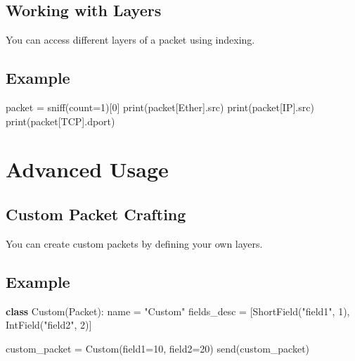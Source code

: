 \documentclass[
  letterpaper,
  DIV=11,
  numbers=noendperiod]{scrreprt}
\newenvironment{Shaded}{\begin{snugshade}}{\end{snugshade}}
\newcommand{\BuiltInTok}[1]{\textcolor[rgb]{0.00,0.23,0.31}{#1}}
\newcommand{\DecValTok}[1]{\textcolor[rgb]{0.68,0.00,0.00}{#1}}
\newcommand{\KeywordTok}[1]{\textcolor[rgb]{0.00,0.23,0.31}{\textbf{#1}}}
\newcommand{\NormalTok}[1]{\textcolor[rgb]{0.00,0.23,0.31}{#1}}
\newcommand{\OperatorTok}[1]{\textcolor[rgb]{0.37,0.37,0.37}{#1}}
\newcommand{\StringTok}[1]{\textcolor[rgb]{0.13,0.47,0.30}{#1}}
\begin{document}
\subsection{Working with Layers}\label{working-with-layers}

You can access different layers of a packet using indexing.

\subsection{Example}\label{example-25}

\begin{Shaded}
\begin{Highlighting}[]
\NormalTok{packet }\OperatorTok{=}\NormalTok{ sniff(count}\OperatorTok{=}\DecValTok{1}\NormalTok{)[}\DecValTok{0}\NormalTok{]}
\BuiltInTok{print}\NormalTok{(packet[Ether].src)}
\BuiltInTok{print}\NormalTok{(packet[IP].src)}
\BuiltInTok{print}\NormalTok{(packet[TCP].dport)}
\end{Highlighting}
\end{Shaded}

\section{Advanced Usage}\label{advanced-usage-2}

\subsection{Custom Packet Crafting}\label{custom-packet-crafting}

You can create custom packets by defining your own layers.

\subsection{Example}\label{example-26}

\begin{Shaded}
\begin{Highlighting}[]
\KeywordTok{class}\NormalTok{ Custom(Packet):}
\NormalTok{    name }\OperatorTok{=} \StringTok{"Custom"}
\NormalTok{    fields\_desc }\OperatorTok{=}\NormalTok{ [ShortField(}\StringTok{"field1"}\NormalTok{, }\DecValTok{1}\NormalTok{), IntField(}\StringTok{"field2"}\NormalTok{, }\DecValTok{2}\NormalTok{)]}

\NormalTok{custom\_packet }\OperatorTok{=}\NormalTok{ Custom(field1}\OperatorTok{=}\DecValTok{10}\NormalTok{, field2}\OperatorTok{=}\DecValTok{20}\NormalTok{)}
\NormalTok{send(custom\_packet)}
\end{Highlighting}
\end{Shaded}
\end{document}
